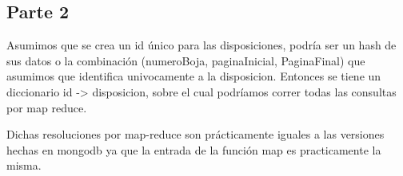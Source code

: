 \subsection{Parte 2}
    Asumimos que se crea un id único para las disposiciones, podría ser un hash de sus datos o
        la combinación (numeroBoja, paginaInicial, PaginaFinal) que asumimos que identifica
        univocamente a la disposicion. Entonces se tiene un diccionario id -> disposicion,
        sobre el cual podríamos correr todas las consultas por map reduce.

    Dichas resoluciones por map-reduce son prácticamente iguales a las versiones hechas en mongodb
        ya que la entrada de la función map es practicamente la misma.



